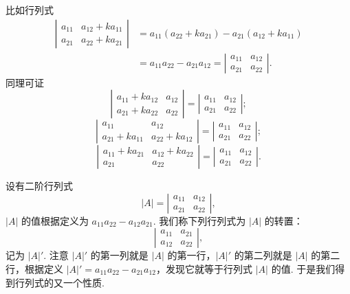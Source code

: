 \documentclass[UTF8, 12pt, fontset=fandol, oneside]{ctexart}
\begin{document}
比如行列式
\[
\begin{aligned}
\left|\begin{array}{cc}
a_{11} & a_{12}+ka_{11}\\
a_{21} & a_{22}+ka_{21}
\end{array}\right|
&=a_{11}(a_{22}+ka_{21})-a_{21}(a_{12}+ka_{11})\\
&=a_{11}a_{22}-a_{21}a_{12}
=\left|\begin{array}{cc}
a_{11} & a_{12}\\
a_{21} & a_{22}
\end{array}\right|.
\end{aligned}
\]
同理可证
\[
\left|\begin{array}{cc}
a_{11}+ka_{12} & a_{12}\\
a_{21}+ka_{22} & a_{22}
\end{array}\right|
=
\left|\begin{array}{cc}
a_{11} & a_{12}\\
a_{21} & a_{22}
\end{array}\right|;
\]
\[
\left|\begin{array}{cc}
a_{11} & a_{12}\\
a_{21}+ka_{11} & a_{22}+ka_{12}
\end{array}\right|
=
\left|\begin{array}{cc}
a_{11} & a_{12}\\
a_{21} & a_{22}
\end{array}\right|;
\]
\[
\left|\begin{array}{cc}
a_{11}+ka_{21} & a_{12}+ka_{22}\\
a_{21} & a_{22}
\end{array}\right|
=
\left|\begin{array}{cc}
a_{11} & a_{12}\\
a_{21} & a_{22}
\end{array}\right|.
\]

设有二阶行列式
\[
|A|=\left|\begin{array}{cc}
a_{11} & a_{12}\\
a_{21} & a_{22}
\end{array}\right|,
\]
$|A|$ 的值根据定义为 $a_{11}a_{22}-a_{12}a_{21}$. 我们称下列行列式为 $|A|$ 的转置：
\[
\left|\begin{array}{cc}
a_{11} & a_{21}\\
a_{12} & a_{22}
\end{array}\right|,
\]
记为 $|A|'$. 注意 $|A|'$ 的第一列就是 $|A|$ 的第一行，$|A|'$ 的第二列就是 $|A|$ 的第二行，根据定义 $|A|'=a_{11}a_{22}-a_{21}a_{12}$，发现它就等于行列式 $|A|$ 的值. 于是我们得到行列式的又一个性质.
\end{document}
